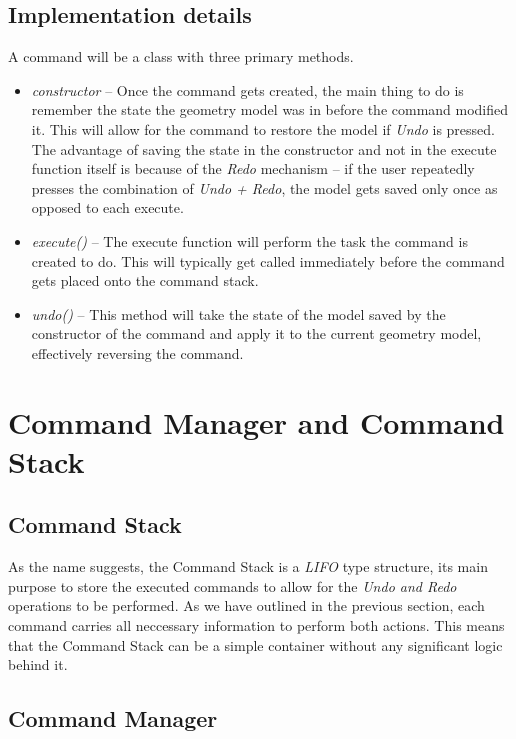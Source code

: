 \subsection*{Implementation details}

A command will be a class with three primary methods.
\begin{itemize}
\item \textit{constructor} -- Once the command gets created, the main thing to do is remember the state the geometry model was in before the command modified it. This will allow for the command to restore the model if \textit{Undo} is pressed. The advantage of saving the state in the constructor and not in the execute function itself is because of the \textit{Redo} mechanism -- if the user repeatedly presses the combination of \textit{Undo + Redo}, the model gets saved only once as opposed to each execute.
\item \textit{execute()} -- The execute function will perform the task the command is created to do. This will typically get called immediately before the command gets placed onto the command stack.
\item \textit{undo()} -- This method will take the state of the model saved by the constructor of the command and apply it to the current geometry model, effectively reversing the command.
\end{itemize}

\section{Command Manager and Command Stack}

\subsection{Command Stack}

As the name suggests, the Command Stack is a \textit{LIFO} type structure, its main purpose to store the executed commands to allow for the \textit{Undo and Redo} operations to be performed. As we have outlined in the previous section, each command carries all neccessary information to perform both actions. This means that the Command Stack can be a simple container without any significant logic behind it.

\subsection{Command Manager}

